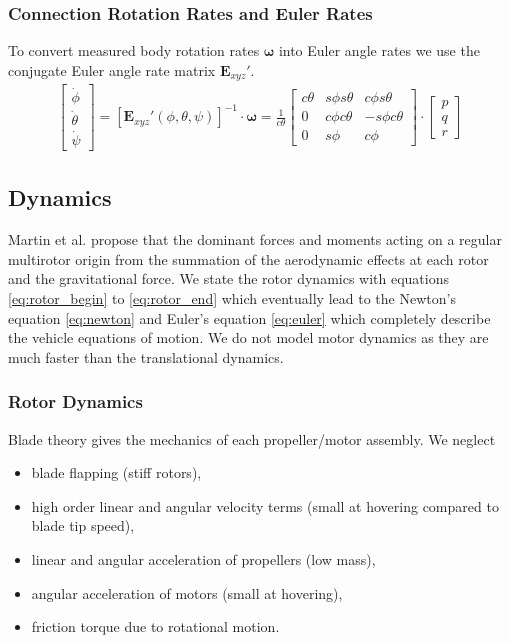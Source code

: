 \subsubsection{Connection Rotation Rates and Euler Rates}
To convert measured body rotation rates $\boldsymbol{\omega}$ into Euler angle rates we use the conjugate Euler angle rate matrix $\mathbf{E}_{xyz}'$.
\begin{align}
\begin{bmatrix}
\dot{\phi} \\ \dot{\theta} \\ \dot{\psi}
\end{bmatrix}
= [\mathbf{E}_{xyz}'(\phi,\theta,\psi)]^{-1} \cdot \boldsymbol{\omega} 
= \frac{1}{c\theta} \begin{bmatrix}
c\theta & s\phi s\theta & c\phi s\theta \\
0 & c\phi c\theta & -s\phi c\theta \\
0 & s\phi & c\phi
\end{bmatrix} \cdot \begin{bmatrix}
p \\ q \\ r
\end{bmatrix}
\end{align}

\subsection{Dynamics}
\label{sec:dynamics}
Martin et al. \cite{Martin2010} propose that the dominant forces and moments acting on a regular multirotor origin from the summation of the aerodynamic effects at each rotor and the gravitational force. We state the rotor dynamics with equations \ref{eq:rotor_begin} to \ref{eq:rotor_end} which eventually lead to the Newton's equation \ref{eq:newton} and Euler's equation \ref{eq:euler} which completely describe the vehicle equations of motion. We do not model motor dynamics as they are much faster than the translational dynamics.

\subsubsection{Rotor Dynamics}
Blade theory gives the mechanics of each propeller/motor assembly. We neglect 
\begin{itemize} 
\item blade flapping (stiff rotors),
\item high order linear and angular velocity terms (small at hovering compared to blade tip speed),
\item linear and angular acceleration of propellers (low mass),
\item angular acceleration of motors (small at hovering),
\item friction torque due to rotational motion.
\end{itemize}

